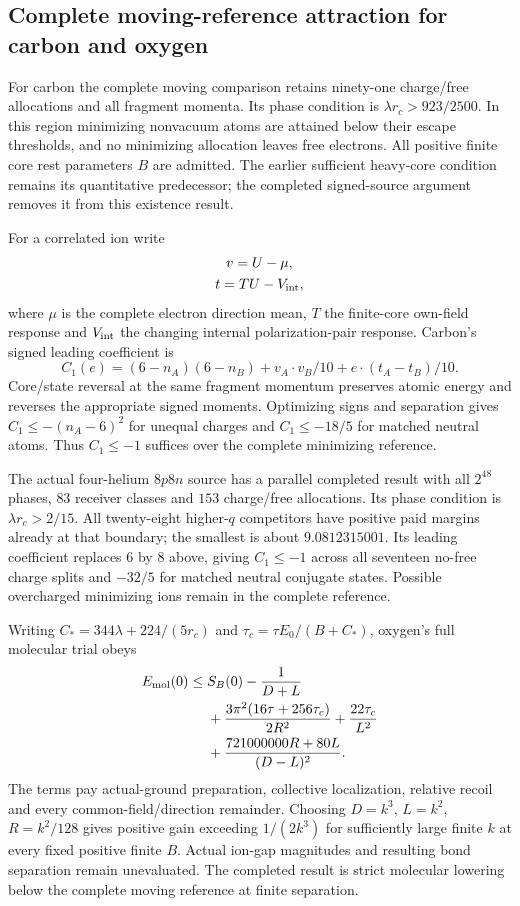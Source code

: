 \subsection{Complete moving-reference attraction for carbon and oxygen}

For carbon the complete moving comparison retains ninety-one charge/free allocations and all fragment momenta. Its phase condition is $\lambda r_c>923/2500$. In this region minimizing nonvacuum atoms are attained below their escape thresholds, and no minimizing allocation leaves free electrons. All positive finite core rest parameters $B$ are admitted. The earlier sufficient heavy-core condition remains its quantitative predecessor; the completed signed-source argument removes it from this existence result. 

For a correlated ion write
\[
\begin{gathered}
v=U-\mu,\\
 t=TU-V_{\rm int},
\end{gathered}
\]
where $\mu$ is the complete electron direction mean, $T$ the finite-core own-field response and $V_{\rm int}$ the changing internal polarization-pair response. Carbon's signed leading coefficient is
\[
 C_1(e)=(6-n_A)(6-n_B)+v_A\cdot v_B/10
                         +e\cdot(t_A-t_B)/10.
\]
Core/state reversal at the same fragment momentum preserves atomic energy and reverses the appropriate signed moments. Optimizing signs and separation gives $C_1\leq-(n_A-6)^2$ for unequal charges and $C_1\leq-18/5$ for matched neutral atoms. Thus $C_1\leq-1$ suffices over the complete minimizing reference.

The actual four-helium $8p8n$ source has a parallel completed result with all $2^{48}$ phases, $83$ receiver classes and $153$ charge/free allocations. Its phase condition is $\lambda r_c>2/15$. All twenty-eight higher-$q$ competitors have positive paid margins already at that boundary; the smallest is about $9.0812315001$. Its leading coefficient replaces $6$ by $8$ above, giving $C_1\leq-1$ across all seventeen no-free charge splits and $-32/5$ for matched neutral conjugate states. Possible overcharged minimizing ions remain in the complete reference. 

Writing $C_*=344\lambda+224/(5r_c)$ and $\tau_c=\tau E_0/(B+C_*)$, oxygen's full molecular trial obeys
\[
 \begin{aligned}
 E_{\rm mol}(0)\leq{}& S_B(0)-\frac1{D+L}\\
 &+\frac{3\pi^2(16\tau+256\tau_c)}{2R^2}
 +\frac{22\tau_c}{L^2}\\
 &+\frac{721000000R+80L}{(D-L)^2}.
 \end{aligned}
\]
The terms pay actual-ground preparation, collective localization, relative recoil and every common-field/direction remainder. Choosing $D=k^3$, $L=k^2$, $R=k^2/128$ gives positive gain exceeding $1/(2k^3)$ for sufficiently large finite $k$ at every fixed positive finite $B$. Actual ion-gap magnitudes and resulting bond separation remain unevaluated. The completed result is strict molecular lowering below the complete moving reference at finite separation.


